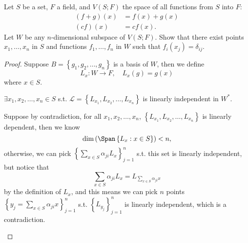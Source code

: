 \begin{problem}
    Let $S$ be a set, $F$ a field, and $V(S; F)$ the space of all functions from $S$ into $F$:
\begin{align*}
(f+g)(x) &= f(x) + g(x) \\
(cf)(x) &= c f(x).
\end{align*}
Let $W$ be any $n$-dimensional subspace of $V(S; F)$. Show that there exist points $x_1, \dots, x_n$ in $S$ and functions $f_1, \dots, f_n$ in $W$ such that $f_i(x_j) = \delta_{ij}$.
\end{problem}
\begin{proof}
    Suppose \(B = \left\{ g_1, g_2, \dots , g_n \right\} \) is a basis of \(W\), then we define 
    \[
        L_x: W \to F, \quad L_x(g) = g(x)
    \] where \(x \in S\). 
    \begin{claim}
        \(\exists x_1, x_2, \dots ,x_n \in S\) s.t. \(\mathcal{L} = \left\{ L_{x_1}, L_{x_2}, \dots , L_{x_n} \right\} \) is linearly independent in \(W^*\).   
    \end{claim}
    \begin{explanation}
        Suppose by contradiction, for all \(x_1, x_2, \dots , x_n\), \(\left\{ L_{x_1}, L_{x_2}, \dots , L_{x_n} \right\} \) is linearly dependent, then we know
        \[
            \dim \left( \Span \left\{ L_x: x\in S \right\}  \right) < n, 
        \] otherwise, we can pick \(\left\{ \sum_{x \in S} \alpha _{ji} L_{x}  \right\}_{j=1}^n \) s.t. this set is linearly independent, but notice that 
        \[
            \sum_{x \in S} \alpha _{ji} L_{x} = L_{\sum_{x \in S} \alpha _{ji} x } 
        \] by the definition of \(L_x\), and this means we can pick \(n\) points \(\left\{ y_j = \sum_{x \in S} \alpha _{ji} x  \right\}_{j=1}^n \) s.t. \(\left\{ L_{y_j} \right\}_{j=1}^n \) is linearly independent, which is a contradiction. 
        

\end{explanation}
\end{proof}
